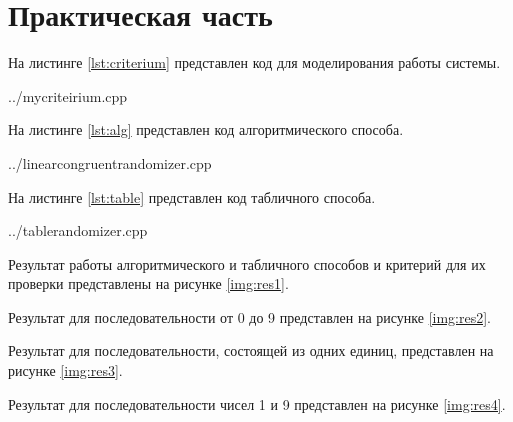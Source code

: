 \chapter{Практическая часть}

На листинге \ref{lst:criterium} представлен код для моделирования работы системы.

\begin{lstinputlisting}[label=lst:criterium,caption=Критерий для оценки случайности, language=c, firstline=1, lastline=35]{../mycriteirium.cpp}
\end{lstinputlisting}

На листинге \ref{lst:alg} представлен код алгоритмического способа.
\begin{lstinputlisting}[label=lst:alg,caption=Алгоритмический способ, language=c, firstline=6, lastline=33]{../linearcongruentrandomizer.cpp}
\end{lstinputlisting}

На листинге \ref{lst:table} представлен код табличного способа.
\begin{lstinputlisting}[label=lst:table,caption=Табличный способ, language=c, firstline=10, lastline=36]{../tablerandomizer.cpp}
\end{lstinputlisting}

Результат работы алгоритмического и табличного способов и критерий для их проверки представлены на рисунке \ref{img:res1}. 


Результат для последовательности от 0 до 9 представлен на рисунке \ref{img:res2}. 

Результат для последовательности, состоящей из одних единиц, представлен на рисунке \ref{img:res3}. 

Результат для последовательности чисел 1 и 9 представлен на рисунке \ref{img:res4}. 
